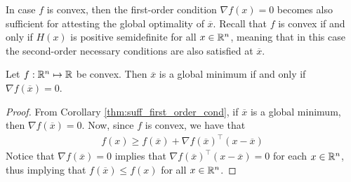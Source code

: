 In case $f$ is convex, then the first-order condition $\nabla f(x) = 0$ becomes also sufficient for attesting the global optimality of $\overline{x}$. Recall that $f$ is convex if and only if $H(x)$ is positive semidefinite for all $x \in \mathbb{R}^n$, meaning that in this case the second-order necessary conditions are also satisfied at $\overline{x}$.
%
\begin{theorem}
Let $f: \mathbb{R}^n \mapsto \mathbb{R}$ be convex. Then $\overline{x}$ is a global minimum if and only if $\nabla f(\overline{x}) = 0$.
\end{theorem}
%
\begin{proof}
From Corollary \ref{thm:suff_first_order_cond}, if $\overline{x}$ is a global minimum, then $\nabla f(\overline{x}) = 0$. Now, since $f$ is convex, we have that
%
\begin{align*}
f(x) \geq f(\overline{x}) + \nabla f(\overline{x})^\top (x - \overline{x})
\end{align*}
%
Notice that $\nabla f(\overline{x}) = 0$ implies that $\nabla f(\overline{x})^\top (x - \overline{x}) = 0$ for each $x \in \mathbb{R}^n$, thus implying that $f(\overline{x}) \leq f(x)$ for all $x \in \mathbb{R}^n$.
\end{proof}
